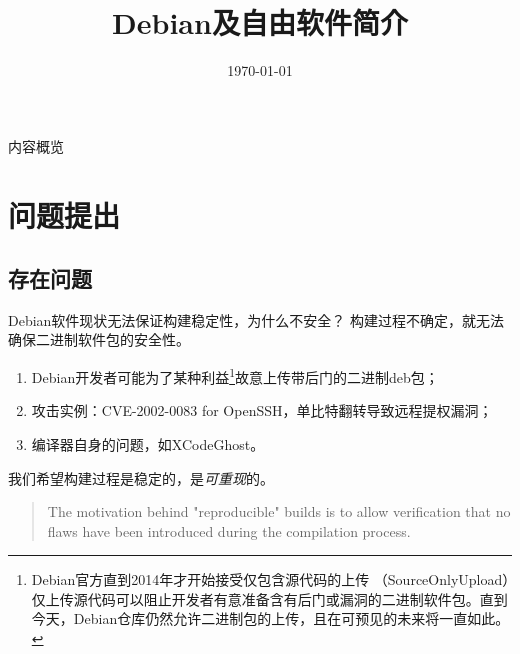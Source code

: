 \documentclass{beamer}
\title[Intro to Debian and FLOSS development]{Debian及自由软件简介}
\author[hosiet]{Boyuan Yang \\ \href{mailto:byang@debian.org}}
\institute[Debian]{Debian Project}
\date{\today}
\begin{document}
\begin{frame}
\titlepage
\end{frame}
\begin{frame}{内容概览}
\tableofcontents
\end{frame}



\section{问题提出}
\subsection{存在问题}
\begin{frame}{Debian软件现状}{无法保证构建稳定性，为什么不安全？}
构建过程不确定，就无法确保二进制软件包的安全性。

\begin{enumerate}
\item Debian开发者可能为了某种利益\footnote{Debian官方直到2014年才开始接受仅包含源代码的上传
（SourceOnlyUpload）仅上传源代码可以阻止开发者有意准备含有后门或漏洞的二进制软件包。直到
今天，Debian仓库仍然允许二进制包的上传，且在可预见的未来将一直如此。\cite{debianwikisou}}故意上传带后门的二进制deb包；
\item 攻击实例：CVE-2002-0083 for OpenSSH，单比特翻转导致远程提权漏洞；
\item 编译器自身的问题，如XCodeGhost。
\end{enumerate}
\pause

我们希望构建过程是稳定的，是\emph{可重现}的。
\vfill

\begin{quotation}
The motivation behind "reproducible" builds is to allow verification that no flaws have been introduced during the compilation process.\cite{minidebconf20161113}
\end{quotation}
\end{frame}
\end{document}
